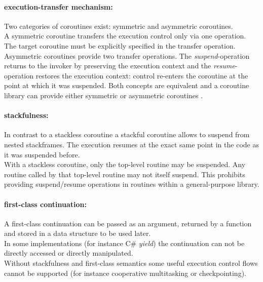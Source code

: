 \paragraph*{execution-transfer mechanism:}
Two categories of coroutines exist: symmetric and asymmetric coroutines.\\
\newline
A symmetric coroutine transfers the execution control only via one operation.
The target coroutine must be explicitly specified in the transfer operation.\\
\newline
Asymmetric coroutines provide two transfer operations.
The \textit{suspend}-operation returns to the invoker by preserving the
execution context and the \textit{resume}-operation restores the execution
context: control re-enters the coroutine at the point at which it was suspended.
Both concepts are equivalent and a coroutine library can provide either
symmetric or asymmetric coroutines \cite{Moura2009}.

\paragraph*{stackfulness:}
In contrast to a stackless coroutine a stackful coroutine allows to suspend
from nested stackframes. The execution resumes at the exact same point in the
code as it was suspended before.\\
With a stackless coroutine, only the top-level routine may be suspended. Any
routine called by that top-level routine may not itself suspend. This prohibits
providing suspend/resume operations in routines within a general-purpose library.

\paragraph*{first-class continuation:}
A first-class continuation can be passed as an argument, returned by a
function and stored in a data structure to be used later.\\
In some implementations (for instance C\# \textit{yield}) the continuation can
not be directly accessed or directly manipulated.\\
\newline
Without stackfulness and first-class semantics some useful execution control
flows cannot be supported (for instance cooperative multitasking or
checkpointing).
